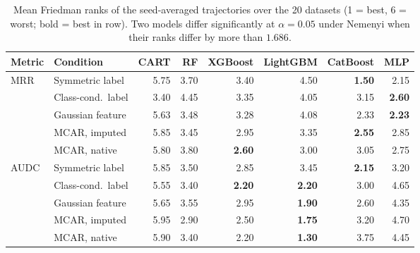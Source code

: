 \begin{table}[t]
\centering
\footnotesize
\setlength{\tabcolsep}{4pt}
\caption{Mean Friedman ranks of the seed-averaged trajectories over the 20 datasets (1 = best, 6 = worst; bold = best in row). Two models differ significantly at $\alpha=0.05$ under Nemenyi when their ranks differ by more than $1.686$.}
\label{tab:ranks}
\begin{tabular*}{\textwidth}{@{\extracolsep{\fill}}llrrrrrr@{}}
\toprule
Metric & Condition & CART & RF & XGBoost & LightGBM & CatBoost & MLP \\
\midrule
MRR & Symmetric label & 5.75 & 3.70 & 3.40 & 4.50 & \textbf{1.50} & 2.15 \\
 & Class-cond.\ label & 3.40 & 4.45 & 3.35 & 4.05 & 3.15 & \textbf{2.60} \\
 & Gaussian feature & 5.63 & 3.48 & 3.28 & 4.08 & 2.33 & \textbf{2.23} \\
 & MCAR, imputed & 5.85 & 3.45 & 2.95 & 3.35 & \textbf{2.55} & 2.85 \\
 & MCAR, native & 5.80 & 3.80 & \textbf{2.60} & 3.00 & 3.05 & 2.75 \\
\midrule
AUDC & Symmetric label & 5.85 & 3.50 & 2.85 & 3.45 & \textbf{2.15} & 3.20 \\
 & Class-cond.\ label & 5.55 & 3.40 & \textbf{2.20} & \textbf{2.20} & 3.00 & 4.65 \\
 & Gaussian feature & 5.65 & 3.55 & 2.95 & \textbf{1.90} & 2.60 & 4.35 \\
 & MCAR, imputed & 5.95 & 2.90 & 2.50 & \textbf{1.75} & 3.20 & 4.70 \\
 & MCAR, native & 5.90 & 3.40 & 2.20 & \textbf{1.30} & 3.75 & 4.45 \\
\bottomrule
\end{tabular*}
\end{table}
